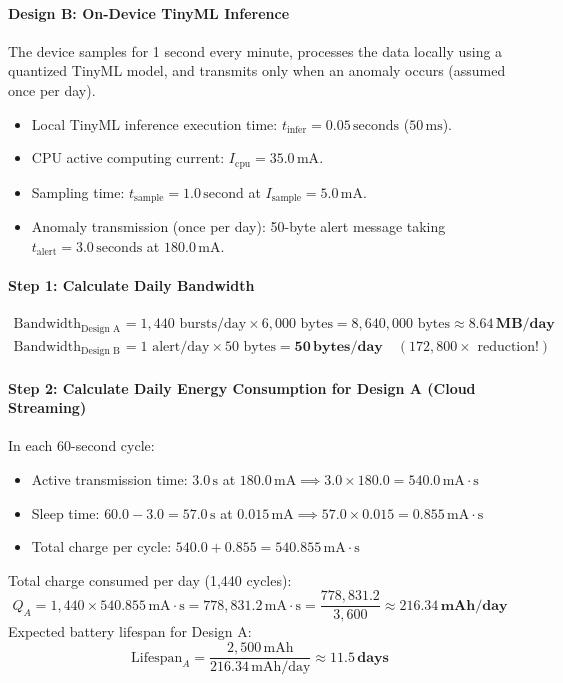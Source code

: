 \begin{example}
\paragraph{Design B: On-Device TinyML Inference}
The device samples for 1 second every minute, processes the data locally using a quantized TinyML model, and transmits only when an anomaly occurs (assumed once per day).
\begin{itemize}
    \item Local TinyML inference execution time: $t_{\text{infer}} = 0.05\,\text{seconds}$ ($50\,\text{ms}$).
    \item CPU active computing current: $I_{\text{cpu}} = 35.0\,\text{mA}$.
    \item Sampling time: $t_{\text{sample}} = 1.0\,\text{second}$ at $I_{\text{sample}} = 5.0\,\text{mA}$.
    \item Anomaly transmission (once per day): 50-byte alert message taking $t_{\text{alert}} = 3.0\,\text{seconds}$ at $180.0\,\text{mA}$.
\end{itemize}

\paragraph{Step 1: Calculate Daily Bandwidth}
\begin{align*}
\text{Bandwidth}_{\text{Design A}} &= 1{,}440 \text{ bursts/day} \times 6{,}000 \text{ bytes} = 8{,}640{,}000 \text{ bytes} \approx \mathbf{8.64\,\text{MB/day}} \\
\text{Bandwidth}_{\text{Design B}} &= 1 \text{ alert/day} \times 50 \text{ bytes} = \mathbf{50\,\text{bytes/day}} \quad (172{,}800\times \text{ reduction!})
\end{align*}

\paragraph{Step 2: Calculate Daily Energy Consumption for Design A (Cloud Streaming)}
In each 60-second cycle:
\begin{itemize}
    \item Active transmission time: $3.0\,\text{s}$ at $180.0\,\text{mA} \implies 3.0 \times 180.0 = 540.0\,\text{mA}\cdot\text{s}$
    \item Sleep time: $60.0 - 3.0 = 57.0\,\text{s}$ at $0.015\,\text{mA} \implies 57.0 \times 0.015 = 0.855\,\text{mA}\cdot\text{s}$
    \item Total charge per cycle: $540.0 + 0.855 = 540.855\,\text{mA}\cdot\text{s}$
\end{itemize}
Total charge consumed per day (1,440 cycles):
\begin{equation*}
Q_A = 1{,}440 \times 540.855\,\text{mA}\cdot\text{s} = 778{,}831.2\,\text{mA}\cdot\text{s} = \frac{778{,}831.2}{3{,}600} \approx \mathbf{216.34\,\text{mAh/day}}
\end{equation*}
Expected battery lifespan for Design A:
\begin{equation*}
\text{Lifespan}_A = \frac{2{,}500\,\text{mAh}}{216.34\,\text{mAh/day}} \approx \mathbf{11.5\,\text{days}}
\end{equation*}


\end{example}
